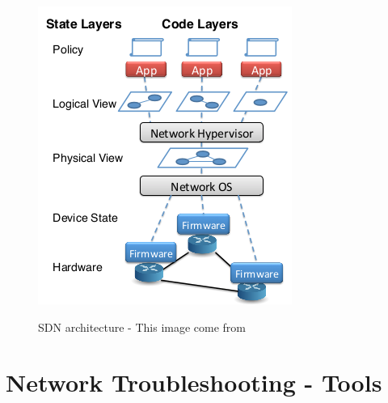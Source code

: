 \documentclass[10pt,article]{IEEEtran}
\begin{document}
\begin{figure}
\centering
\includegraphics[scale=0.65]{layers.png}
\label{layers}
\caption{SDN architecture - This image come from \cite{Heller:2013:LSL:2491185.2491197}}
\end{figure}
\section{Network Troubleshooting - Tools}
\label{Network Troubleshooting - Tools}
\end{document}
